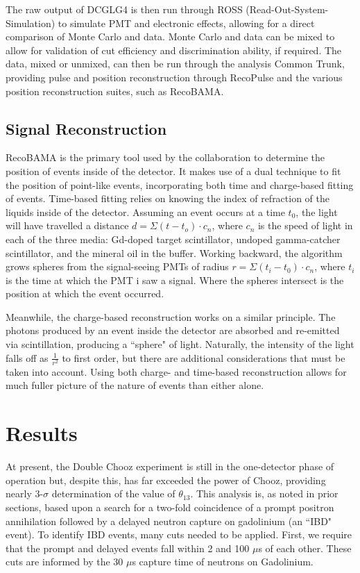The raw output of DCGLG4 is then run through ROSS (Read-Out-System-Simulation) to simulate PMT and electronic effects, allowing for a direct comparison of Monte Carlo and data. Monte Carlo and data can be mixed to allow for validation of cut efficiency and discrimination ability, if required. The data, mixed or unmixed, can then be run through the analysis Common Trunk, providing pulse and position reconstruction through RecoPulse and the various position reconstruction suites, such as RecoBAMA. 

\subsection{Signal Reconstruction}
\label{sec:RECO}
RecoBAMA is the primary tool used by the collaboration to determine the position of events inside of the detector. It makes use of a dual technique to fit the position of point-like events, incorporating both time and charge-based fitting of events. Time-based fitting relies on knowing the index of refraction of the liquids inside of the detector. Assuming an event occurs at a time $t_0$, the light will have travelled a distance $d= \Sigma(t-t_o) \cdot c_n$, where $c_n$ is the speed of light in each of the three media: Gd-doped target scintillator, undoped gamma-catcher scintillator, and the mineral oil in the buffer. Working backward, the algorithm grows spheres from the signal-seeing PMTs of radius $r =\Sigma (t_i-t_0) \cdot c_n$, where $t_i$ is the time at which the PMT i saw a signal. Where the spheres intersect is the position at which the event occurred. 

Meanwhile, the charge-based reconstruction works on a similar principle. The photons produced by an event inside the detector are absorbed and re-emitted via scintillation, producing a ``sphere" of light. Naturally, the intensity of the light falls off as $\frac{1}{r^2}$ to first order, but there are additional considerations that must be taken into account. Using both charge- and time-based reconstruction allows for much fuller picture of the nature of events than either alone. 

\section{Results}
At present, the Double Chooz experiment is still in the one-detector phase of operation but, despite this, has far exceeded the power of Chooz, providing nearly 3-$\sigma$ determination of the value of $\theta_{13}$.  This analysis is, as noted in prior sections, based upon a search for a two-fold coincidence of a prompt positron annihilation followed by a delayed neutron capture on gadolinium (an ``IBD" event). To identify IBD events, many cuts needed to be applied.  First, we require that the prompt and delayed events fall within 2 and 100 $\mu$s of each other. These cuts are informed by the 30 $\mu$s capture time of neutrons on Gadolinium. 

